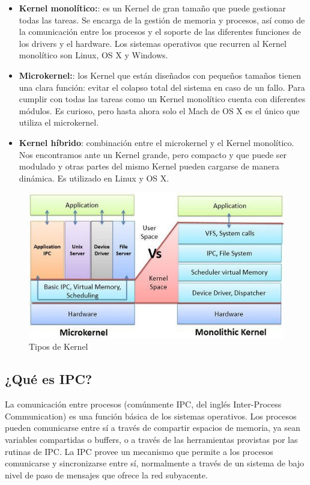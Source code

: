 \documentclass[11pt,twoside]{book}
\begin{document}
\begin{itemize}

\item \textbf{Kernel monolítico:}: es un Kernel de gran tamaño que puede gestionar todas las tareas. Se encarga de la gestión de memoria y procesos, así como de la comunicación entre los procesos y el soporte de las diferentes funciones de los drivers y el hardware. Los sistemas operativos que recurren al Kernel monolítico son Linux, OS X y Windows.

\item \textbf{Microkernel:}: los Kernel que están diseñados con pequeños tamaños tienen una clara función: evitar el colapso total del sistema en caso de un fallo. Para cumplir con todas las tareas como un Kernel monolítico cuenta con diferentes módulos. Es curioso, pero hasta ahora solo el Mach de OS X es el único que utiliza el microkernel.

\item \textbf{Kernel híbrido}: combinación entre el microkernel y el Kernel monolítico. Nos encontramos ante un Kernel grande, pero compacto y que puede ser modulado y otras partes del mismo Kernel pueden cargarse de manera dinámica. Es utilizado en Linux y OS X. 

\end{itemize}

\vspace{5pt}

\begin{figure}[htb]
  \centering
  \includegraphics[width=1\linewidth]{TK.png}
  \caption{Tipos de Kernel}
  \label{fig:etiqueta}
\end{figure}

\subsection{¿Qué es IPC?}
La comunicación entre procesos (comúnmente IPC, del inglés Inter-Process Communication) es una función básica de los sistemas operativos. Los procesos pueden comunicarse entre sí a través de compartir espacios de memoria, ya sean variables compartidas o buffers, o a través de las herramientas provistas por las rutinas de IPC. La IPC provee un mecanismo que permite a los procesos comunicarse y sincronizarse entre sí, normalmente a través de un sistema de bajo nivel de paso de mensajes que ofrece la red subyacente.
\end{document}
